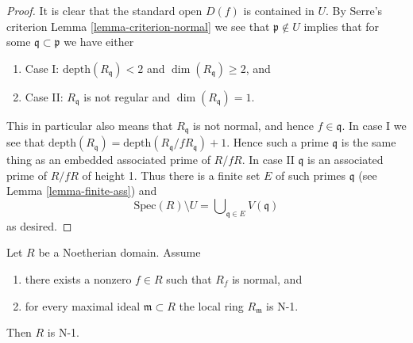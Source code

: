 \begin{proof}
It is clear that the standard open $D(f)$ is contained in $U$.
By Serre's criterion Lemma \ref{lemma-criterion-normal} we see that
$\mathfrak p \not \in U$ implies that for some
$\mathfrak q \subset \mathfrak p$ we have
either
\begin{enumerate}
\item Case I: $\text{depth}(R_{\mathfrak q}) < 2$
and $\dim(R_{\mathfrak q}) \geq 2$, and
\item Case II: $R_{\mathfrak q}$ is not regular
and $\dim(R_{\mathfrak q}) = 1$.
\end{enumerate}
This in particular also means that $R_{\mathfrak q}$ is not
normal, and hence $f \in \mathfrak q$. In case I we see that
$\text{depth}(R_{\mathfrak q}) =
\text{depth}(R_{\mathfrak q}/fR_{\mathfrak q}) + 1$.
Hence such a prime $\mathfrak q$ is the same thing as an embedded
associated prime of $R/fR$. In case II $\mathfrak q$ is an associated
prime of $R/fR$ of height 1. Thus there is a finite set $E$
of such primes $\mathfrak q$ (see Lemma \ref{lemma-finite-ass}) and
$$
\text{Spec}(R) \setminus U
=
\bigcup\nolimits_{\mathfrak q \in E} V(\mathfrak q)
$$
as desired.
\end{proof}

\begin{lemma}
\label{lemma-characterize-N-1}
Let $R$ be a Noetherian domain.
Assume
\begin{enumerate}
\item there exists a nonzero $f \in R$ such that $R_f$ is normal, and
\item for every maximal ideal $\mathfrak m \subset R$
the local ring $R_{\mathfrak m}$ is N-1.
\end{enumerate}
Then $R$ is N-1.
\end{lemma}

